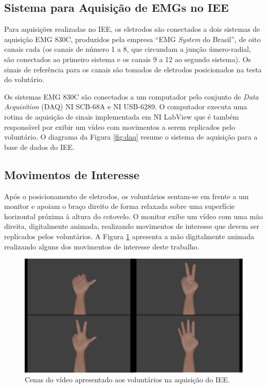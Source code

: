 			\subsection{Sistema para Aquisição de EMGs no IEE}
Para aquisições realizadas no IEE, os eletrodos são conectados a dois sistemas de aquisição EMG 830C, produzidos pela empresa ``EMG \emph{System} do Brasil'', de oito canais cada (os canais de número 1 a 8, que circundam a junção úmero-radial, são conectados ao primeiro sistema e os canais 9 a 12 ao segundo sistema). Os sinais de referência para os canais são tomados de eletrodos posicionados na testa do volutário.

Os sistemas EMG 830C são conectados a um computador pelo conjunto de \emph{Data Acquisition} (DAQ) NI SCB-68A e NI USB-6289. O computador executa uma rotina de aquisição de sinais implementada em NI LabView que é também responsável por exibir um vídeo com movimentos a serem replicados pelo voluntário. O diagrama da Figura \ref{fig:daq} resume o sistema de aquisição para a base de dados do IEE.



			\subsection{Movimentos de Interesse}
Após o posicionamento de eletrodos, os voluntários sentam-se em frente a um monitor e apoiam o braço direito de forma relaxada sobre uma superfície horizontal próxima à altura do cotovelo. O monitor exibe um vídeo com uma mão direita, digitalmente animada, realizando movimentos de interesse que devem ser replicados pelos voluntários. A Figura \ref{fig:video} apresenta a mão digitalmente animada realizando alguns dos movimentos de interesse deste trabalho.

\begin{figure}[htb]
	\caption{\label{fig:video}Cenas do vídeo apresentado aos voluntários na aquisição do IEE.}
	\begin{center}
	    \includegraphics[width=0.75\linewidth]{./img/scenes.png}
	\end{center}
\end{figure}

